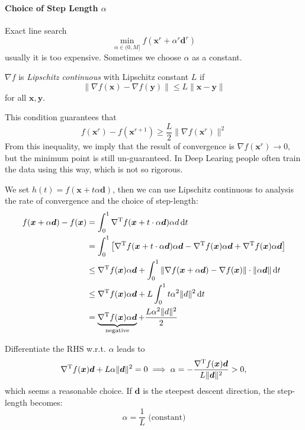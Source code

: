 \paragraph{Choice of Step Length $\alpha$}
Exact line search
\[
\min_{\alpha\in(0,M]}f(\bm x^r+\alpha^r\bm d^r)
\]
usually it is too expensive. Sometimes we choose $\alpha$ as a constant.
\begin{definition}
$\nabla f$ is \emph{Lipschitz continuous} with Lipschitz constant $L$ if
\[
\|\nabla f(\bm x) - \nabla f(\bm y)\|\le L\|\bm x-\bm y\|
\]
for all $\bm x,\bm y$.
\end{definition}
\begin{remark}
This condition guarantees that 
\[
f(\bm x^r) - f(\bm x^{r+1})\ge\frac{L}{2}\|\nabla f(\bm x^r)\|^2
\]
From this inequality, we imply that the result of convergence is $\nabla f(\bm x^r)\to0$, but the minimum point is still un-guaranteed. In Deep Learing people often train the data using this way, which is not so rigorous.
\end{remark}
We set $h(t) = f(\bm x+t\alpha\bm d)$, then we can use Lipschitz continuous to analysis the rate of convergence and the choice of step-length:
\begin{align*}
f(\bm x+\alpha\bm d) - f(\bm x)
&=
\int_0^1\nabla^{\mathrm T} f(\bm x+t\cdot\alpha\bm d)\alpha d\,\mathrm{d} t\\
&=
\int_0^1\left[
\nabla^{\mathrm T} f(\bm x+t\cdot\alpha\bm d)\alpha\bm d
-\nabla^{\mathrm T} f(\bm x)\alpha\bm d
+\nabla^{\mathrm T} f(\bm x)\alpha\bm d
\right]\\
&\le
\nabla^{\mathrm T} f(\bm x)\alpha\bm d
+
\int_0^1\|\nabla f(\bm x+\alpha\bm d) - \nabla f(\bm x)\|\cdot\|\alpha\bm d\|\,\mathrm{d} t\\
&\le \nabla^{\mathrm T} f(\bm x)\alpha\bm d
+L\int_0^1t\alpha^2\|d\|^2\,\mathrm{d} t\\
&=\underbrace{\nabla^{\mathrm T} f(\bm x)\alpha\bm d}_{\text{negative}}+\frac{L\alpha^2\| d\|^2}{2}
\end{align*}

Differentiate the RHS w.r.t. $\alpha$ leads to
\[
\nabla^{\mathrm T} f(\bm x)\bm d+L\alpha\|\bm d\|^2=0\implies
\alpha=-\frac{\nabla^{\mathrm T} f(\bm x)\bm d}{L\|\bm d\|^2}>0,
\]
which seems a reasonable choice. If $\bm d$ is the steepest descent direction, the step-length becomes:
\[
\alpha=\frac{1}{L}\mbox{ (constant)}
\]












